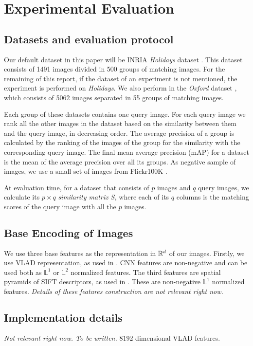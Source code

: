 \section{Experimental Evaluation}
\subsection{Datasets and evaluation protocol} \label{eval:protocol}
Our default dataset in this paper will be INRIA \emph{Holidays} dataset \cite{holidays}. This dataset consists of 1491 images divided in 500 groups of matching images. For the remaining of this report, if the dataset of an experiment is not mentioned, the experiment is performed on \emph{Holidays}.
We also perform in the \emph{Oxford} dataset \cite{oxford}, which consists of 5062 images separated in 55 groups of matching images.

Each group of these datasets contains one query image. For each query image we rank all the other images in the dataset based on the similarity between them and the query image, in decreasing order. The average precision of a group is calculated by the ranking of the images of the group for the similarity with the corresponding query image. The final mean average precision (mAP) for a dataset is the mean of the average precision over all its groups.
As negative sample of images, we use a small set of images from Flickr100K \cite{oxford}.

At evaluation time, for a dataset that consists of $p$ images and $q$ query images, we calculate its $p\times q$ \emph{similarity matrix} $S$, where each of its $q$ columns is the matching scores of the query image with all the $p$ images.
\subsection{Base Encoding of Images}
We use three base features as the representation in $\mathbb R^d$ of our images. Firstly, we use VLAD representation, as used in \cite{ZePe15}. 
CNN features are non-negative and can be used both as $\mathbb{L}^1$ or $\mathbb{L}^2$ normalized features. The third features are spatial pyramids of SIFT descriptors, as used in \cite{spk}. These are non-negative $\mathbb{L}^1$ normalized features. \emph{\color{red} Details of these features construction are not relevant right now.}
\subsection{Implementation details}
\emph{\color{red} Not relevant right now.  To be written.}
$8192$ dimensional VLAD features.

